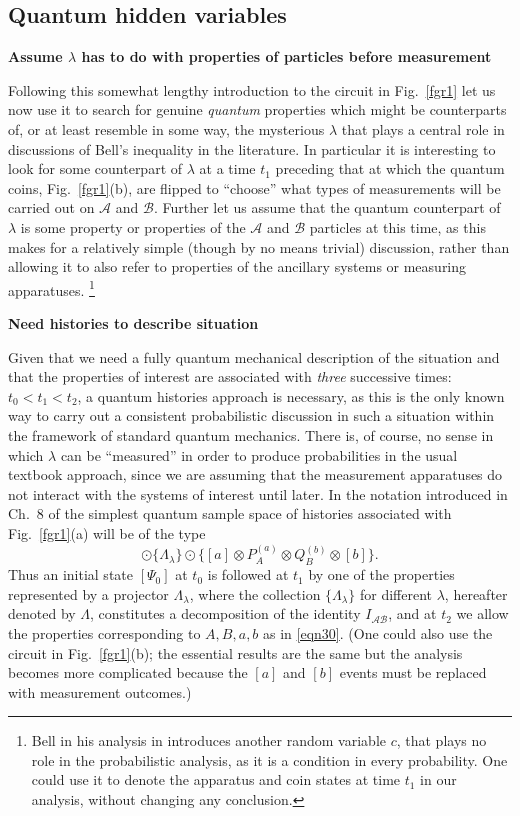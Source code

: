 \documentclass[12pt]{article} %
\def\outl#1{\par{\medskip\noindent\hspace*{.5cm}\bf
      \mathversion{bold}#1\mathversion{normal}\smallskip} }
\def\np{} \def\xa{} \def\xb{} \def\xn{} \def\xp{}
\def\outl#1{} \def\np{} \def\xa{} \def\xb{} \def\xn{} \def\xp{}
\def\outl#1{\par{\medskip\noindent\hspace*{.5cm}\bf
      \mathversion{bold}#1\mathversion{normal}\smallskip} }
\def\np{\newpage }\def\xn{\nopagebreak }\def\xp{\pagebreak }
\newcommand{\od}{\odot }
\newcommand{\ot}{\otimes }
\newcommand{\AM}{{\mathcal A}}
\newcommand{\BM}{{\mathcal B}}
\newcommand{\lm}{\lambda }
\newcommand{\Lm}{\Lambda }
\begin{document}
\xb
\subsection{Quantum hidden variables}
\label{sct5c}
\xa

\xb
\outl{Assume $\lm$ has to do with properties of particles before measurement}
\xa



Following this somewhat lengthy introduction to the circuit in Fig.~\ref{fgr1}
let us now use it to search for genuine \emph{quantum} properties which might
be counterparts of, or at least resemble in some way, the mysterious $\lm$
that plays a central role in discussions of Bell's inequality in the
literature.  In particular it is interesting to look for some counterpart of
$\lm$ at a time $t_1$ preceding that at which the quantum coins,
Fig.~\ref{fgr1}(b), are flipped to ``choose'' what types of measurements will
be carried out on $\AM$ and $\BM$.  Further let us assume that the quantum
counterpart of $\lm$ is some property or properties of the $\AM$ and $\BM$
particles at this time, as this makes for a relatively simple (though by no
means trivial) discussion, rather than allowing it to also refer to properties
of the ancillary systems or measuring apparatuses.%
\footnote{Bell in his analysis in \cite{Bll90b} introduces another random
  variable $c$, that plays no role in the probabilistic analysis, as it is a
  condition in every probability.  One could use it to denote the apparatus
  and coin states at time $t_1$ in our analysis, without changing any
  conclusion.} %

\xb
\outl{Need histories to describe situation}
\xa


Given that we need a fully quantum mechanical description of the situation and
that the properties of interest are associated with \emph{three} successive
times: $t_0<t_1<t_2$, a quantum histories approach is necessary, as this is
the only known way to carry out a consistent probabilistic discussion in such
a situation within the framework of standard quantum mechanics.  There is, of
course, no sense in which $\lm$ can be ``measured'' in order to produce
probabilities in the usual textbook approach, since we are assuming that the
measurement apparatuses do not interact with the systems of interest until
later.  In the notation introduced in Ch.~8 of \cite{Grff02c} the simplest
quantum sample space of histories associated with Fig.~\ref{fgr1}(a) will be
of the type
\begin{equation}
  [\Psi_0] \od \{\Lm_\lm\} \od \{ [a]\ot P^{(a)}_A\ot Q^{(b)}_B  \ot[b]\}.
\label{eqn34}
\end{equation}
Thus an initial state $[\Psi_0]$ at $t_0$ is followed at $t_1$ by one of the
properties represented by a projector $\Lm_\lm$, where the collection
$\{\Lm_\lm\}$ for different $\lm$, hereafter denoted by $\Lm$, constitutes a
decomposition of the identity $I_{\AM\BM}$, and at $t_2$ we allow the
properties corresponding to $A,B,a,b$ as in \eqref{eqn30}.  (One could also
use the circuit in Fig.~\ref{fgr1}(b); the essential results are the same but
the analysis becomes more complicated because the $[a]$ and $[b]$ events must
be replaced with measurement outcomes.)
\end{document}
